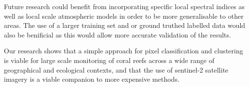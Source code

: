 \documentclass[journal,article,submit,pdftex,moreauthors]{Definitions/mdpi}
\begin{document}
Future research could benefit from incorporating specific local spectral indices as well as local scale atmospheric models in order to be more generalisable to other areas. The use of a larger training set and or ground truthed labelled data would also be benificial as this would allow more accurate validation of the results. 

Our research shows that a simple approach for pixel classification and clustering is viable for large scale monitoring of coral reefs across a wide range of geographical and ecological contexts, and that the use of sentinel-2 satellite imagery is a viable companion to more expensive methods.


\vspace{6pt} 



\end{document}
